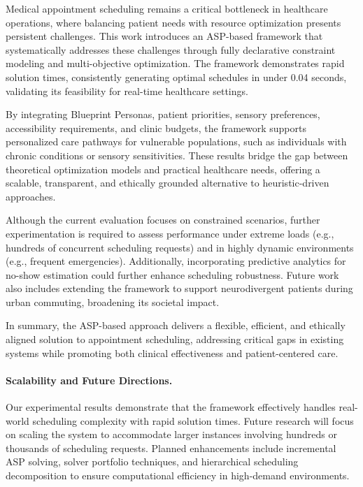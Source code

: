 \documentclass{tlp}
\begin{document}
Medical appointment scheduling remains a critical bottleneck in healthcare operations, where balancing patient needs with resource optimization presents persistent challenges. This work introduces an ASP-based framework that systematically addresses these challenges through fully declarative constraint modeling and multi-objective optimization. The framework demonstrates rapid solution times, consistently generating optimal schedules in under 0.04 seconds, validating its feasibility for real-time healthcare settings.

By integrating Blueprint Personas, patient priorities, sensory preferences, accessibility requirements, and clinic budgets, the framework supports personalized care pathways for vulnerable populations, such as individuals with chronic conditions or sensory sensitivities. These results bridge the gap between theoretical optimization models and practical healthcare needs, offering a scalable, transparent, and ethically grounded alternative to heuristic-driven approaches.

Although the current evaluation focuses on constrained scenarios, further experimentation is required to assess performance under extreme loads (e.g., hundreds of concurrent scheduling requests) and in highly dynamic environments (e.g., frequent emergencies). Additionally, incorporating predictive analytics for no-show estimation could further enhance scheduling robustness. Future work also includes extending the framework to support neurodivergent patients during urban commuting, broadening its societal impact.

In summary, the ASP-based approach delivers a flexible, efficient, and ethically aligned solution to appointment scheduling, addressing critical gaps in existing systems while promoting both clinical effectiveness and patient-centered care.

\paragraph{Scalability and Future Directions.}
Our experimental results demonstrate that the framework effectively handles real-world scheduling complexity with rapid solution times. Future research will focus on scaling the system to accommodate larger instances involving hundreds or thousands of scheduling requests. Planned enhancements include incremental ASP solving, solver portfolio techniques, and hierarchical scheduling decomposition to ensure computational efficiency in high-demand environments.
\end{document}
